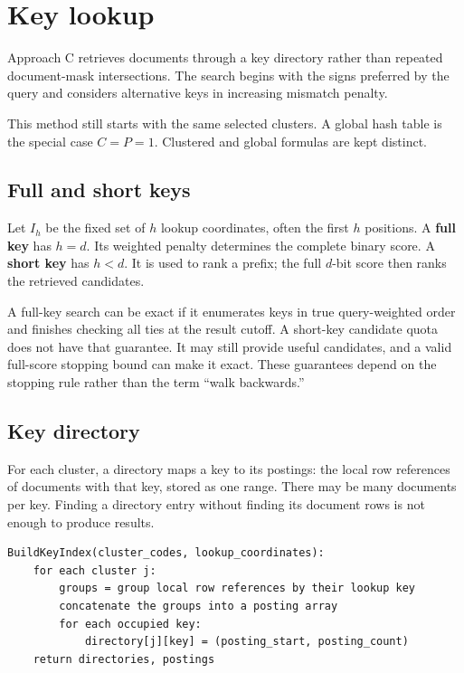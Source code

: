 \section{Key lookup}
\label{sec:keys}
Approach C retrieves documents through a key directory rather than repeated document-mask intersections.
The search begins with the signs preferred by the query and considers alternative keys
in increasing mismatch penalty.

This method still starts with the same selected clusters. A global hash table is
the special case $C=P=1$. Clustered and global formulas are kept distinct.


\subsection{Full and short keys}
Let $I_h$ be the fixed set of $h$ lookup coordinates, often the first $h$ positions. A
\textbf{full key} has $h=d$. Its weighted penalty determines the complete binary score.
A \textbf{short key} has $h<d$. It is used to rank a prefix; the full $d$-bit score then ranks the
retrieved candidates.

A full-key search can be exact if it enumerates keys in true query-weighted order and finishes
checking all ties at the result cutoff. A short-key candidate quota does not have that guarantee. It may still
provide useful candidates, and a valid full-score stopping bound can make it exact. These guarantees
depend on the stopping rule rather than the term ``walk backwards.''

\subsection{Key directory}
For each cluster, a directory maps a key to its postings: the local row references of
documents with that key, stored as one range. There may be many documents per key. Finding a directory entry
without finding its document rows is not enough to produce results.

\par\noindent\begin{minipage}{\linewidth}
\begin{lstlisting}[caption={Build a clustered key index.}]
BuildKeyIndex(cluster_codes, lookup_coordinates):
    for each cluster j:
        groups = group local row references by their lookup key
        concatenate the groups into a posting array
        for each occupied key:
            directory[j][key] = (posting_start, posting_count)
    return directories, postings
\end{lstlisting}
\end{minipage}\par

